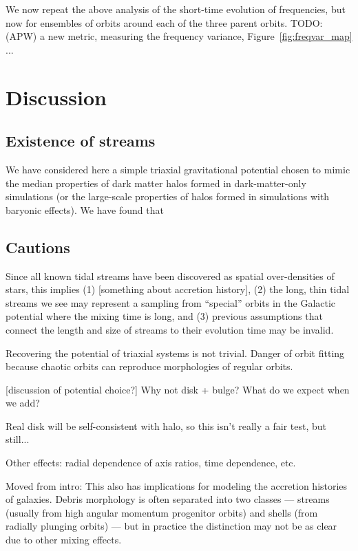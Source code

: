 \documentclass[letterpaper,12pt,preprint]{aastex}
\newcommand{\todo}[2]{{\color{red} TODO: (\MakeUppercase{#1}) #2}}
\begin{document}
We now repeat the above analysis of the short-time evolution of frequencies, but now for ensembles of orbits around each of the three parent orbits. \todo{apw}{a new metric, measuring the frequency variance, Figure~\ref{fig:freqvar_map} ...}

\section{Discussion}\label{sec:discussion}

\subsection{Existence of streams}

We have considered here a simple triaxial gravitational potential chosen to mimic the median properties of dark matter halos formed in dark-matter-only simulations (or the large-scale properties of halos formed in simulations with baryonic effects). We have found that 

\subsection{Cautions}

Since all known tidal streams have been discovered as spatial over-densities of stars, this implies (1) [something about accretion history], (2) the long, thin tidal streams we see may represent a sampling from ``special'' orbits in the Galactic potential where the mixing time is long, and (3) previous assumptions that connect the length and size of streams to their evolution time may be invalid.

Recovering the potential of triaxial systems is not trivial. Danger of orbit fitting because chaotic orbits can reproduce morphologies of regular orbits.

[discussion of potential choice?]
Why not disk + bulge? What do we expect when we add?

Real disk will be self-consistent with halo, so this isn't really a fair test, but still...

Other effects: radial dependence of axis ratios, time dependence, etc.

Moved from intro:
This also has implications for modeling the accretion histories of galaxies. Debris morphology is often separated into two classes --- streams (usually from high angular momentum progenitor orbits) and shells (from radially plunging orbits) --- but in practice the distinction may not be as clear due to other mixing effects.
\end{document}
